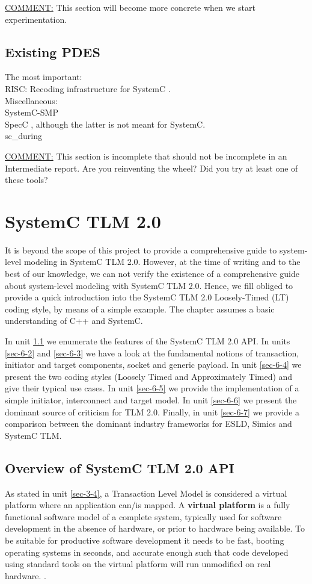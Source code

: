 \documentclass[12pt,twoside]{article}
\begin{document}
\uline{COMMENT:} This section will become more concrete when we start experimentation.


\subsection{Existing PDES}
\label{sec-5-7}
The most important: \\
RISC: Recoding infrastructure for SystemC \cite{Liu2015}.\\
Miscellaneous: \\
SystemC-SMP \cite{Mello2010} \\
SpecC \cite{Domer2011}, although the latter is not meant for SystemC.\\
sc\_during \cite{Moy}

\uline{COMMENT:} This section is incomplete that should not be incomplete in an Intermediate report. 
Are you reinventing the wheel? 
Did you try at least one of these tools?
\clearpage


\section{SystemC TLM 2.0}
\label{sec-6}
It is beyond the scope of this project to provide a comprehensive guide to system-level modeling in SystemC TLM 2.0.
However, at the time of writing and to the best of our knowledge, we can not verify the existence of a comprehensive guide about system-level modeling with SystemC TLM 2.0.
Hence, we fill obliged to provide a quick introduction into the SystemC TLM 2.0 Loosely-Timed (LT) coding style, by means of a simple example.
The chapter assumes a basic understanding of C++ and SystemC.

In unit \ref{sec-6-1} we enumerate the features of the SystemC TLM 2.0 API.
In units \ref{sec-6-2} and \ref{sec-6-3} we have a look at the fundamental notions of transaction, initiator and target components, socket and generic payload.
In unit \ref{sec-6-4} we present the two coding styles (Loosely Timed and Approximately Timed) and give their typical use cases.
In unit \ref{sec-6-5} we provide the implementation of a simple initiator, interconnect and target model.
In unit \ref{sec-6-6} we present the dominant source of criticism for TLM 2.0.
Finally, in unit \ref{sec-6-7} we provide a comparison between the dominant industry frameworks for ESLD, Simics and SystemC TLM.

\subsection{Overview of SystemC TLM 2.0 API}
\label{sec-6-1}
As stated in unit \ref{sec-3-4}, a Transaction Level Model is considered a virtual platform where an application can/is mapped.
A \textbf{virtual platform} is a fully functional software model of a complete system, typically used for software development in the absence of hardware, or prior to hardware being available. 
To be suitable for productive software development it needs to be fast, booting operating systems in seconds, and accurate enough such that code developed using standard tools on the virtual platform will run unmodified on real hardware. \cite{Leupers2010}.
\end{document}
